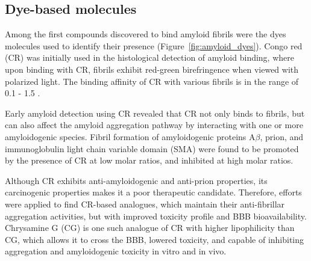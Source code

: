 
\subsection{Dye-based molecules}

Among the first compounds discovered to bind amyloid fibrils were the dyes molecules used to identify their presence (Figure~\ref{fig:amyloid_dyes}). Congo red (CR) was initially used in the histological detection of amyloid binding, where upon binding with CR, fibrils exhibit red-green birefringence when viewed with polarized light.\cite{Frid:2007bo} The binding affinity of CR with various fibrils is in the range of 0.1 - 1.5 \micromolar.\cite{Lendel:2009cg,Benditt:1970va,Klunk:1989vc}

Early amyloid detection using CR revealed that CR not only binds to fibrils, but can also affect the amyloid aggregation pathway by interacting with one or more amyloidogenic species.\cite{Caspi:1998vt}
Fibril formation of amyloidogenic proteins A$\beta$,\cite{Esler:1997bq} prion,\cite{Rudyk:2000ta} and immunoglobulin light chain variable domain (SMA)\cite{Kim:2003hv} were found to be promoted by the presence of CR at low molar ratios, and inhibited at high molar ratios. 

Although CR exhibits anti-amyloidogenic and anti-prion properties, its carcinogenic properties makes it a poor therapeutic candidate. Therefore, efforts were applied to find CR-based analogues, which maintain their anti-fibrillar aggregation activities, but with improved toxicity profile and BBB bioavailability. Chrysamine G (CG) is one such analogue of CR with higher lipophilicity than CG, which allows it to cross the BBB, lowered toxicity, and capable of inhibiting aggregation and amyloidogenic toxicity in vitro and in vivo.\cite{Klunk:1994um,Klunk:1998vm,Reinke:2007p155,Ishii:2002uf}

